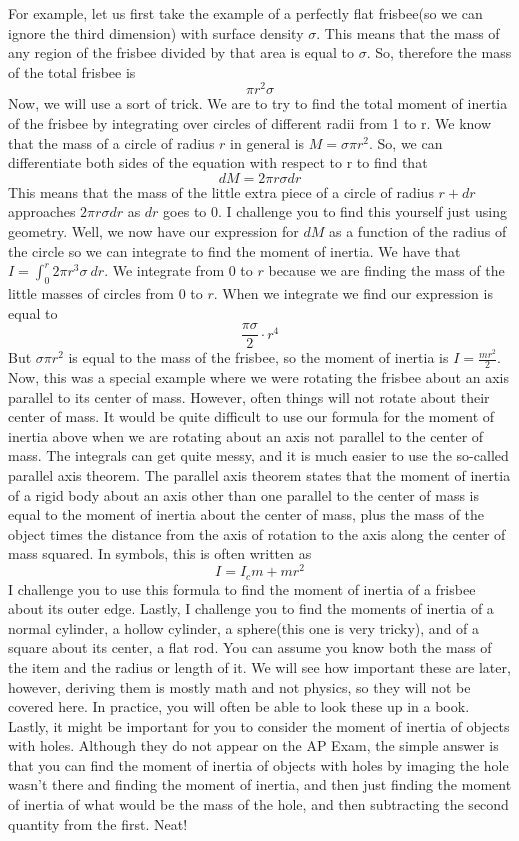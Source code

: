 For example, let us first take the example of a perfectly flat frisbee(so we can ignore the third dimension) with surface density $\sigma$. This means that the mass of any region of the frisbee divided by that area is equal to $\sigma$. So, therefore the mass of the total frisbee is $$\pi r^2 \sigma$$ Now, we will use a sort of trick. We are to try to find the total moment of inertia of the frisbee by integrating over circles of different radii from 1 to r. We know that the mass of a circle of radius $r$ in general is $M=\sigma \pi r^2$. So, we can differentiate both sides of the equation with respect to r to find that \begin{equation}dM= 2\pi r \sigma dr\end{equation} This means that the mass of the little extra piece of a circle of radius $r+dr$ approaches $2\pi r \sigma dr$ as $dr$ goes to 0. I challenge you to find this yourself just using geometry. Well, we now have our expression for $dM$ as a function of the radius of the circle so we can integrate to find the moment of inertia. We have that $I= \int_{0}^{r} 2\pi r^3 \sigma \ dr$. We integrate from $0$ to $r$ because we are finding the mass of the little masses of circles from $0$ to $r$. When we integrate we find our expression is equal to $$\frac{\pi \sigma}{2} \cdot r^4$$ But $\sigma \pi r^2$ is equal to the mass of the frisbee, so the moment of inertia is $I = \frac{mr^2}{2}$. Now, this was a special example where we were rotating the frisbee about an axis parallel to its center of mass. However, often things will not rotate about their center of mass. It would be quite difficult to use our formula for the moment of inertia above when we are rotating about an axis not parallel to the center of mass. The integrals can get quite messy, and it is much easier to use the so-called parallel axis theorem. The parallel axis theorem states that the moment of inertia of a rigid body about an axis other than one parallel to the center of mass is equal to the moment of inertia about the center of mass, plus the mass of the object times the distance from the axis of rotation to the axis along the center of mass squared. In symbols, this is often written as \begin{equation}I=I_cm+mr^2\end{equation} I challenge you to use this formula to find the moment of inertia of a frisbee about its outer edge. Lastly, I challenge you to find the moments of inertia of a normal cylinder, a hollow cylinder, a sphere(this one is very tricky), and of a square about its center, a flat rod. You can assume you know both the mass of the item and the radius or length of it. We will see how important these are later, however, deriving them is mostly math and not physics, so they will not be covered here. In practice, you will often be able to look these up in a book. Lastly, it might be important for you to consider the moment of inertia of objects with holes. Although they do not appear on the AP Exam, the simple answer is that you can find the moment of inertia of objects with holes by imaging the hole wasn’t there and finding the moment of inertia, and then just finding the moment of inertia of what would be the mass of the hole, and then subtracting the second quantity from the first. Neat!